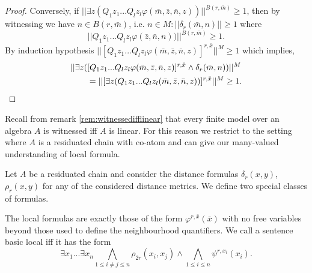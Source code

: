 \documentclass{lmcs} %
\newcommand{\?}{\ensuremath{\mkern0.4\thinmuskip}}
\let\bigland=\bigwedge%
\let\phi=\varphi
\begin{document}
\begin{proof}
    Conversely, if $||\exists z(Q_1z_1...Q_lz_l\phi(\bar{m},\bar{z},\bar{n},z))||^{B(r,\bar{m})}\geq 1$, then by witnessing we have $n\in B(r,\bar{m})$, i.e. $n\in M:||\delta_r(\bar{m},n)||\geq 1$ where \[||Q_1z_1...Q_lz_l\phi(\bar{z},\bar{n},n))||^{B(r,\bar{m})}\geq 1.\]
    By induction hypothesis $||[Q_1z_1...Q_lz_l\phi(\bar{m},\bar{z},\bar{n},z)]^{r,\bar{x}}||^M\geq 1$ which implies,
    \begin{align*}
      &||\exists z([Q_1z_1...Q_lz_l\phi(\bar{m},\bar{z},\bar{n},z)]^{r,\bar{x}}\land \delta_r(\bar{m},n))||^M\\
      &\qquad=
      ||[\exists z(Q_1z_1...Q_lz_l(\bar{m},\bar{z},\bar{n},z))]^{r,\bar{x}}||^M
      \geq 1.\qedhere
    \end{align*}
\end{proof}

Recall from remark \ref{rem:witnessedifflinear} that every finite model over an algebra $A$ is witnessed iff $A$ is linear. For this reason we restrict to the setting where $A$ is a residuated chain with co-atom and can give our many-valued understanding of local formula. 
\begin{defi}
    Let $A$ be a residuated chain and consider the distance formulas $\delta_r(x,y)$, $\rho_r(x,y)$ for any of the considered distance metrics. We define two special classes of formulas. 

    The local formulas are exactly those of the form $\phi^{r,\bar{x}}(\bar{x})$ with no free variables beyond those used to define the neighbourhood quantifiers. We call a sentence basic local iff it has the form \[\exists x_1...\exists x_n\bigland\limits_{1\leq i\not =j\leq n}\rho_{2r}(x_i,x_j)\land\bigland\limits_{1\leq i\leq n}\psi^{r,x_i}(x_i).\]
\end{defi}
\end{document}
